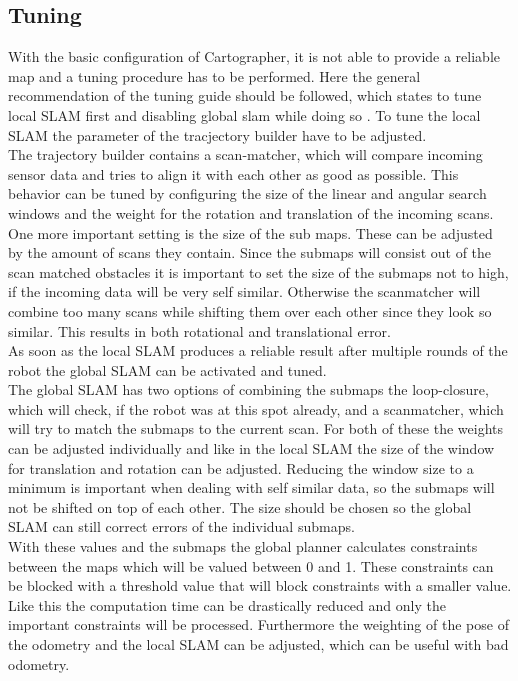 \subsection{Tuning}
With the basic configuration of Cartographer, it is not able to provide a reliable map and a tuning procedure has to be performed. Here the general recommendation of the tuning guide should be followed, which states to tune local SLAM first and disabling global slam while doing so \cite{cartographertuning}.
To tune the local SLAM the parameter of the tracjectory builder have to be adjusted.\\
The trajectory builder contains a scan-matcher, which will compare incoming sensor data and tries to align it with each other as good as possible. This behavior can be tuned by configuring the size of the linear and angular search windows and the weight for the rotation and translation of the incoming scans.\\
One more important setting is the size of the sub maps. These can be adjusted by the amount of scans they contain. Since the submaps will consist out of the scan matched obstacles it is important to set the size of the submaps not to high, if the incoming data will be very self similar. Otherwise the scanmatcher will combine too many scans while shifting them over each other since they look so similar. This results in both rotational and translational error.\\
As soon as the local SLAM produces a reliable result after multiple rounds of the robot the global SLAM can be activated and tuned.\\

The global SLAM has two options of combining the submaps the loop-closure, which will check, if the robot was at this spot already, and a scanmatcher, which will try to match the submaps to the current scan. For both of these the weights can be adjusted individually and like in the local SLAM the size of the window for translation and rotation can be adjusted. Reducing the window size to a minimum is important when dealing with self similar data, so the submaps will not be shifted on top of each other. The size should be chosen so the global SLAM can still correct errors of the individual submaps.\\
With these values and the submaps the global planner calculates constraints between the maps which will be valued between 0 and 1. These constraints can be blocked with a threshold value that will block constraints with a smaller value. Like this the computation time can be drastically reduced and only the important constraints will be processed. Furthermore the weighting of the pose of the odometry and the local SLAM can be adjusted, which can be useful with bad odometry.

